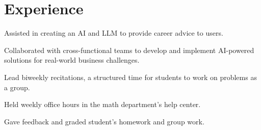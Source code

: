 \documentclass[letterpaper]{resume_AMcEnaney} %
\begin{document}
\begin{minipage}[t]{0.66\textwidth} %


\section{Experience}


        \vspace{\topsep} %
        \begin{tightitemize}
            \item Assisted in creating an AI and LLM to provide career advice to users.
            \item Collaborated with cross-functional teams to develop and implement AI-powered solutions for real-world business challenges.
        \end{tightitemize}

        \sectionspace %



        \begin{tightitemize}
            \item Lead biweekly recitations, a structured time for students to work on problems as a group.
            \item Held weekly office hours in the math department's help center.
            \item Gave feedback and graded student's homework and group work.
        \end{tightitemize}

        \sectionspace %




\end{minipage}
\end{document}
